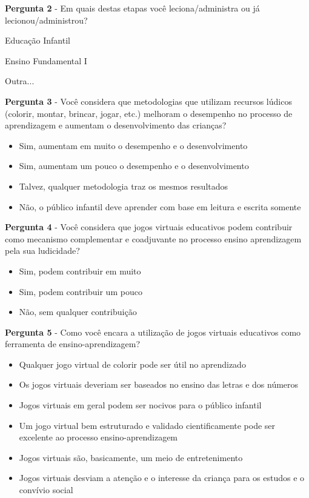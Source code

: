 \documentclass[article,12pt,openany,oneside,a4paper,english,brazil]{abntex2}
\begin{document}
\textbf{Pergunta 2} - Em quais destas etapas você leciona/administra ou já lecionou/administrou?
\begin{todolist}
     \item Educação Infantil
     \item Ensino Fundamental I
     \item Outra...
\end{todolist}

\textbf{Pergunta 3} - Você considera que metodologias que utilizam recursos lúdicos (colorir, montar, brincar, jogar, etc.) melhoram o desempenho no processo de aprendizagem e aumentam o desenvolvimento das crianças?
\begin{itemize}
     \item Sim, aumentam em muito o desempenho e o desenvolvimento
     \item Sim, aumentam um pouco o desempenho e o desenvolvimento
     \item Talvez, qualquer metodologia traz os mesmos resultados
     \item Não, o público infantil deve aprender com base em leitura e escrita somente
\end{itemize}

\textbf{Pergunta 4} - Você considera que jogos virtuais educativos podem contribuir como mecanismo complementar e coadjuvante no processo ensino aprendizagem pela sua ludicidade?
\begin{itemize}
     \item Sim, podem contribuir em muito
     \item Sim, podem contribuir um pouco
     \item Não, sem qualquer contribuição
\end{itemize}

\textbf{Pergunta 5} - Como você encara a utilização de jogos virtuais educativos como ferramenta de ensino-aprendizagem?
\begin{itemize}
     \item Qualquer jogo virtual de colorir pode ser útil no aprendizado
     \item Os jogos virtuais deveriam ser baseados no ensino das letras e dos números
     \item Jogos virtuais em geral podem ser nocivos para o público infantil
     \item Um jogo virtual bem estruturado e validado cientificamente pode ser excelente ao processo ensino-aprendizagem
     \item Jogos virtuais são, basicamente, um meio de entretenimento
     \item Jogos virtuais desviam a atenção e o interesse da criança para os estudos e o convívio social
\end{itemize}
\end{document}
